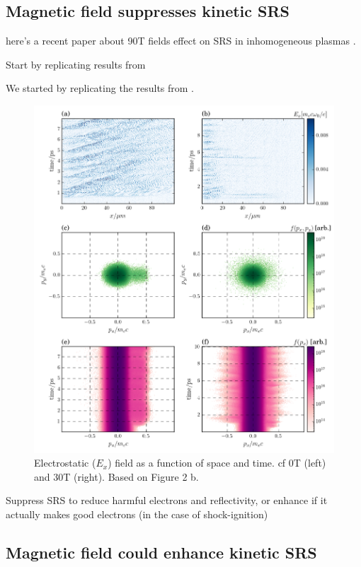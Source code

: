 \subsection{Magnetic field suppresses kinetic SRS}

here's a recent paper about 90T fields effect on SRS in inhomogeneous plasmas \citep{Zhou2021}. 

Start by replicating results from \cite{Winjum2018}

We started by replicating the results from \citet{Winjum2018}.


\begin{figure}[ht]
   \centering
    \includegraphics[width=\columnwidth]{Chapters/C6_magSRS/Winjum_rep_megaPlot.png}
    \caption{Electrostatic ($E_x$) field as a function of space and time. cf 0T (left) and 30T (right). Based on Figure 2 b. \citep{Winjum2018}}
    \label{fig:WinjumRep}
\end{figure}{}


Suppress SRS to reduce harmful electrons and reflectivity, or enhance if it actually makes good electrons (in the case of shock-ignition)

\subsection{Magnetic field could enhance kinetic SRS}


